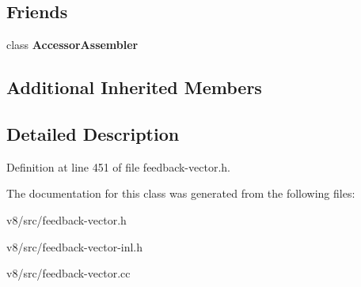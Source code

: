 \subsection*{Friends}
\begin{DoxyCompactItemize}
\item 
\mbox{\label{classv8_1_1internal_1_1FeedbackMetadata_a93a0224847297a8eb55ad69a914805a0}} 
class {\bfseries Accessor\+Assembler}
\end{DoxyCompactItemize}
\subsection*{Additional Inherited Members}


\subsection{Detailed Description}


Definition at line 451 of file feedback-\/vector.\+h.



The documentation for this class was generated from the following files\+:\begin{DoxyCompactItemize}
\item 
v8/src/feedback-\/vector.\+h\item 
v8/src/feedback-\/vector-\/inl.\+h\item 
v8/src/feedback-\/vector.\+cc\end{DoxyCompactItemize}
